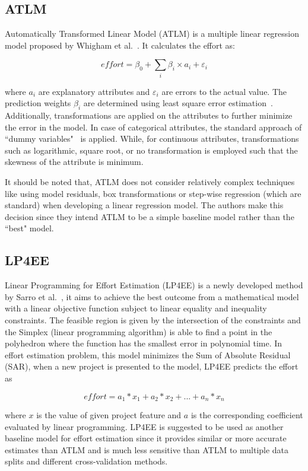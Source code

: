 \subsection{ATLM}
\label{sec:atlm}
Automatically Transformed Linear Model (ATLM) is a multiple linear regression model proposed by Whigham et al.~\cite{Whigham:2015}. It calculates the effort as:

\[
\mathit{effort} = \beta_0 + \sum_i\beta_i\times a_{i} +  \varepsilon_i
\]

where $a_i$ are explanatory attributes and $\varepsilon_i$ are errors to the actual value. The prediction weights $\beta_i$ are determined using least square error estimation~\cite{neter1996applied}. Additionally, transformations are applied on the attributes to further minimize the error in the model. In case of categorical attributes, the standard approach of ``dummy variables"~\cite{hardy1993regression} is applied. While, for continuous attributes, transformations such as logarithmic, square root,  or no transformation is employed such that the skewness of the attribute is minimum. 

It should be noted that, ATLM does not consider relatively complex techniques like using model residuals,  box transformations or step-wise regression (which are standard) when developing a linear regression model. The authors make this decision since they intend ATLM to be a simple baseline model rather than the ``best" model.


\subsection{LP4EE}
\label{sec:lp4ee}
Linear Programming for Effort Estimation (LP4EE) is a newly developed method by Sarro et al.~\cite{SarroTOSEM2018}, it aims to achieve the best outcome from a mathematical
model with a linear objective function subject to linear equality and inequality
constraints. The feasible region is given by the intersection of the constraints and the
Simplex (linear programming algorithm) is able to find a point in the polyhedron where
the function has the smallest error in polynomial time. In effort estimation problem, this model minimizes the Sum of Absolute Residual (SAR), when a new project is presented to the model, LP4EE predicts the effort as

\[
\mathit{effort} = a_1*x_1 + a_2*x_2 + ... + a_n*x_n
\]

where $x$ is the value of given project feature and $a$ is the corresponding coefficient evaluated by linear programming.
LP4EE is suggested to be used as another baseline model for effort estimation since it provides
similar or more accurate estimates than ATLM and is much less sensitive than ATLM
to multiple data splits and different cross-validation methods.

